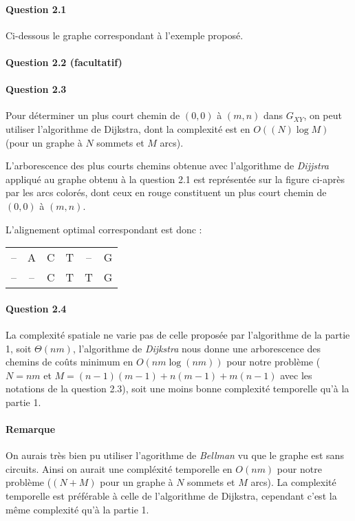 \paragraph{Question 2.1}
Ci-dessous le graphe correspondant \`a l'exemple propos\'e.

\pagebreak

\paragraph{Question 2.2 (facultatif)}

\paragraph{Question 2.3}
Pour d\'eterminer un plus court chemin de $(0,0)$ \`a $(m,n)$ dans
$G_{XY}$, on peut utiliser l'algorithme de Dijkstra, dont la
complexit\'e est en $O((N)\log M)$ (pour un graphe \`a $N$ sommets
et $M$ arcs).

L'arborescence des plus courts chemins obtenue avec l'algorithme de
\emph{Dijjstra} appliqu\'e au graphe obtenu \`a la question 2.1 est
repr\'esent\'ee sur la figure ci-apr\`es par les arcs color\'es, dont
ceux en rouge constituent un plus court chemin de $(0,0)$ \`a $(m,n)$.


L'alignement optimal correspondant est donc :
\begin{table*}[h]
  \centering
  \begin{tabular}{c|ccccc}
    \hline
    --&A&C&T&--&G\\
    --&--&C&T&T&G\\
    \hline
  \end{tabular}
\end{table*}

\paragraph{Question 2.4}
La complexit\'e spatiale ne varie pas de celle propos\'ee par
l'algorithme de la partie 1, soit $\Theta(nm)$, l'algorithme de
\emph{Dijkstra} nous donne une arborescence des chemins de co\^uts
minimum en $O(nm\log(nm))$ pour notre probl\`eme ($N=nm$ et
$M=(n-1)(m-1)+n(m-1)+m(n-1)$ avec les notations de la question 2.3),
soit une moins bonne complexit\'e temporelle qu'\`a la partie 1.

\paragraph{Remarque}
On aurais tr\`es bien pu utiliser l'agorithme de \emph{Bellman} vu que
le graphe est sans circuits. Ainsi on aurait une compl\'exit\'e
temporelle en $O(nm)$ pour notre probl\`eme ($(N+M)$ pour un graphe
\`a $N$ sommets et $M$ arcs). La complexit\'e temporelle est
pr\'ef\'erable \`a celle de l'algorithme de Dijkstra, cependant c'est
la m\^eme complexit\'e qu'\`a la partie 1.
